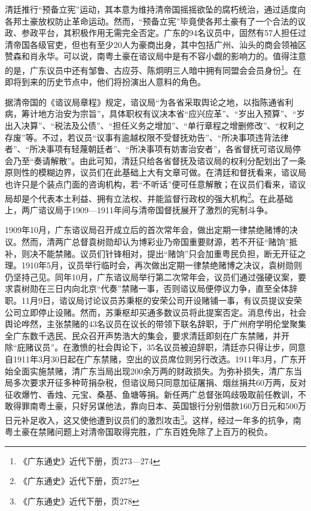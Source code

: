 清廷推行“预备立宪”运动，其本意为维持清帝国摇摇欲坠的腐朽统治，通过适度向各邦土豪放权防止革命运动。然而，“预备立宪”毕竟使各邦土豪有了一个合法的议政、参政平台，其积极作用无需完全否定。广东的94名议员中，固然有57人担任过清帝国各级官吏，但也有至少20人为豪商出身，其中包括广州、汕头的商会领袖区赞森和肖永华。可以说，南粤土豪在谘议局中是有不容小觑的影响力的。值得注意的是，广东议员中还有邹鲁、古应芬、陈炯明三人暗中拥有同盟会会员身份\footnote{《广东通史》近代下册，页273—274}。在即将到来的历史节点中，他们将扮演出人意料的角色。

据清帝国的《谘议局章程》规定，谘议局“为各省采取舆论之地，以指陈通省利病，筹计地方治安为宗旨”，具体职权有议决本省“应兴应革”、“岁出入预算”、“岁出入决算”、“税法及公债”、“担任义务之增加”、“单行章程之增删修改”、“权利之存废”等。不过，若议员“议事有逾越权限不受督抚劝告”、“所决事项违背法律者”、“所决事项有轻蔑朝廷者”、“所决事项有妨害治安者”，各省督抚可谘议局停会乃至“奏请解散”。由此可知，清廷只给各省督抚及谘议局的权利分配划出了一条原则性的模糊边界，议员们在此基础上大有文章可做。在清廷和督抚看来，谘议局也许只是个装点门面的咨询机构，若“不听话”便可任意解散；在议员们看来，谘议局却是个代表本土利益、拥有立法权、并能监督行政权的强大机构\footnote{《广东通史》近代下册，页275}。在此基础上，两广谘议局于1909—1911年间与清帝国督抚展开了激烈的宪制斗争。

1909年10月，广东谘议局召开成立后的首次常年会，做出定期一律禁绝赌博的决议。然而，清两广总督袁树勋却认为博彩业乃帝国重要财源，若不开征“赌饷”抵补，则决不能禁赌。议员们针锋相对，提出“赌饷”只会加重粤民负担，断无开征之理。1910年5月，议员举行临时会，再次做出定期一律禁绝赌博之决议，袁树勋则仍坚持己见。同年10月，广东谘议局举行第二次常年会，议员们通过强硬议案，要求袁树勋在三日内向北京“代奏”禁赌一事，否则谘议局便停议力争，直至全体辞职。11月9日，谘议局讨论议员苏秉枢的安荣公司开设赌铺一事，有议员提议安荣公司立即停止设赌。然而，苏秉枢却买通多数议员将此提案否定。消息传出，社会舆论哗然，主张禁赌的43名议员在议长的带领下联名辞职，于广州府学明伦堂聚集全广东数千选民、民众召开声势浩大的集会，要求清廷即刻在广东禁赌，并开除“庇赌议员”。在激愤的社会舆论下，35名议员被迫辞职，清廷亦只得让步，同意自1911年3月30日起在广东禁赌，空出的议员席位则另行改选。1911年3月，广东开始全面实施禁赌，清广东当局出现200余万两的财政损失。为弥补损失，清广东当局多次要求开征多种苛捐杂税，但谘议局只同意加征屠捐、烟丝捐共60万两，反对征收爆竹、香烛、元宝、桑基、鱼塘等捐。新任两广总督张鸣歧吸取前任教训，不敢得罪南粤土豪，只好另谋他法，靠向日本、英国银行分别借款160万日元和500万日元补足收入，这又使他遭到议员们的激烈攻击\footnote{《广东通史》近代下册，页278}。这样，经过一年多的抗争，南粤土豪在禁赌问题上对清帝国取得完胜，广东百姓免除了上百万的税负。

